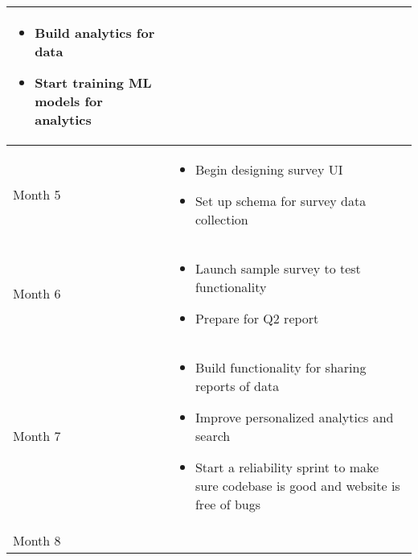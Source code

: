 \begin{table}[H]
\begin{tabularx}{\textwidth}{|l|X|}
\begin{minipage}{\linewidth}
\begin{itemize}[itemsep=3pt,parsep=-1pt,leftmargin=*]
        \item Build analytics for data
        \item Start training ML models for analytics
        \end{itemize}
        \vspace{-2pt}
        \end{minipage}\\\hline
      Month 5 & \begin{minipage}{\linewidth}
        \vspace{6pt}
        \begin{itemize}[itemsep=3pt,parsep=-1pt,leftmargin=*]
        \item Begin designing survey UI 
        \item Set up schema for survey data collection
        \end{itemize}
        \vspace{-2pt}
        \end{minipage}\\\hline
      Month 6 & \begin{minipage}{\linewidth}
        \vspace{6pt}
        \begin{itemize}[itemsep=3pt,parsep=-1pt,leftmargin=*]
        \item Launch sample survey to test functionality
        \item Prepare for Q2 report
        \end{itemize}
        \vspace{-2pt}
        \end{minipage}\\\hline
      Month 7 & \begin{minipage}{\linewidth}
        \vspace{6pt}
        \begin{itemize}[itemsep=3pt,parsep=-1pt,leftmargin=*]
        \item Build functionality for sharing reports of data
        \item Improve personalized analytics and search
        \item Start a reliability sprint to make sure codebase is good and website is free of bugs
        \end{itemize}
        \vspace{-2pt}
        \end{minipage}\\\hline
      Month 8 & \begin{minipage}{\linewidth}

\end{minipage}
\end{tabularx}
\end{table}
